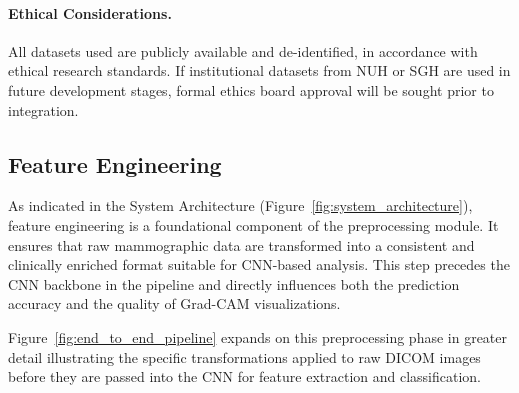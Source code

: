 \documentclass[12pt]{article}
\begin{document}
\paragraph{Ethical Considerations.}
All datasets used are publicly available and de-identified, in accordance with ethical research standards. If institutional datasets from NUH or SGH are used in future development stages, formal ethics board approval will be sought prior to integration.

\subsection{Feature Engineering}
\label{subsection:Feature Engineering}

As indicated in the System Architecture (Figure~\ref{fig:system_architecture}), feature engineering is a foundational component of the preprocessing module. It ensures that raw mammographic data are transformed into a consistent and clinically enriched format suitable for CNN-based analysis. This step precedes the CNN backbone in the pipeline and directly influences both the prediction accuracy and the quality of Grad-CAM visualizations.

Figure~\ref{fig:end_to_end_pipeline} expands on this preprocessing phase in greater detail illustrating the specific transformations applied to raw DICOM images before they are passed into the CNN for feature extraction and classification.
\end{document}
